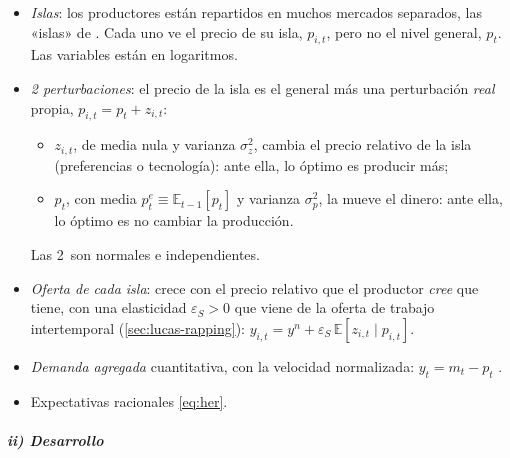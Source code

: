 \documentclass[11pt]{article}
\begin{document}
\begin{itemize}
\item \emph{Islas}: los productores están repartidos en muchos mercados separados, las «islas» de \textcite{Phelps1970Microeconomic}. Cada uno ve el precio de su isla, $p_{i,t}$, pero no el nivel general, $p_t$. Las variables están en logaritmos.
\item \emph{2 perturbaciones}: el precio de la isla es el general más una perturbación \emph{real} propia, $p_{i,t}=p_t+z_{i,t}$:
  \begin{itemize}
  \item $z_{i,t}$, de media nula y varianza $\sigma^2_z$, cambia el precio relativo de la isla (preferencias o tecnología): ante ella, lo óptimo es producir más;
  \item $p_t$, con media $p^e_t\equiv\mathbb{E}_{t-1}[p_t]$ y varianza $\sigma^2_p$, la mueve el dinero: ante ella, lo óptimo es no cambiar la producción.
  \end{itemize}
  Las 2~son normales e independientes.
\item \emph{Oferta de cada isla}: crece con el precio relativo que el productor \emph{cree} que tiene, con una elasticidad $\varepsilon_S>0$ que viene de la oferta de trabajo intertemporal (\ref{sec:lucas-rapping}): $y_{i,t}=y^n+\varepsilon_S\,\mathbb{E}[z_{i,t}\mid p_{i,t}]$.
\item \emph{Demanda agregada} cuantitativa, con la velocidad normalizada: $y_t=m_t-p_t$ .
\item Expectativas racionales \eqref{eq:her}.
\end{itemize}

\subparagraph{ii) Desarrollo}
\end{document}
